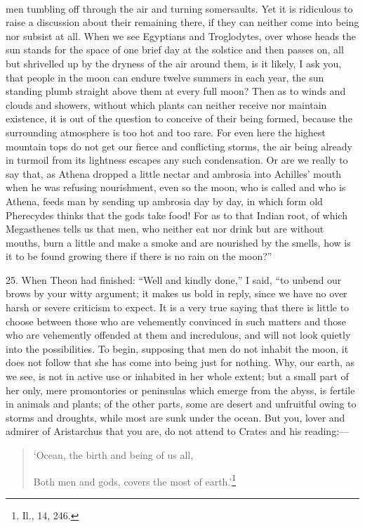 \documentclass[a4paper, 11pt, oneside, polutonikogreek, english]{article}
\begin{document}
\paragraph{}
men tumbling off through the air and turning somersaults. Yet it is ridiculous to raise a discussion about their remaining there, if they can neither come into being nor subsist at all. When we see Egyptians and Troglodytes, over whose heads the sun stands for the space of one brief day at the solstice and then passes on, all but shrivelled up by the dryness of the air around them, is it likely, I ask you, that people in the moon can endure twelve summers in each year, the sun standing plumb straight above them at every full moon? Then as to winds and clouds and showers, without which plants can neither receive nor maintain existence, it is out of the question to conceive of their being formed, because the surrounding atmosphere is too hot and too rare. For even here the highest mountain tops do not get our fierce and conflicting storms, the air being already in turmoil from its lightness escapes any such condensation. Or are we really to say that, as Athena dropped a little nectar and ambrosia into Achilles' mouth when he was refusing nourishment, even so the moon, who is called and who is Athena, feeds man by sending up ambrosia day by day, in which form old Pherecydes thinks that the gods take food! For as to that Indian root, of which Megasthenes tells us that men, who neither eat nor drink but are without mouths, burn a little and make a smoke and are nourished by the smells, how is it to be found growing there if there is no rain on the moon?''

25. When Theon had finished: ``Well and kindly done,'' I said, ``to unbend our brows by your witty argument; it makes us bold in reply, since we have no over harsh or severe criticism to expect. It is a very true saying that there is little to choose between those who are vehemently convinced in such matters and those who are vehemently offended at them and incredulous, and will not look quietly into the possibilities. To begin, supposing that men do not inhabit the moon, it does not follow that she has come into being just for nothing. Why, our earth, as we see, is not in active use or inhabited in her whole extent; but a small part of her only, mere promontories or peninsulas which emerge from the abyss, is fertile in animals and plants; of the other parts, some are desert and unfruitful owing to storms and droughts, while most are sunk under the ocean. But you, lover and admirer of Aristarchus that you are, do not attend to Crates and his reading:---
\begin{quotation}
`Ocean, the birth and being of us all,

Both men and gods, covers the most of earth.'\footnote{Il., 14, 246.}
\end{quotation}
\end{document}
